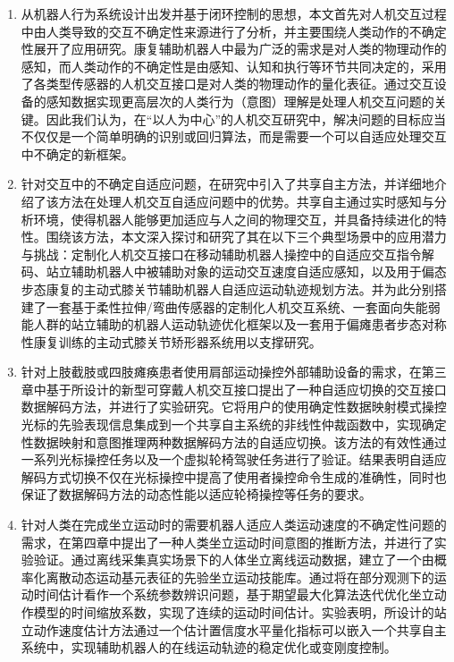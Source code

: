 \begin{enumerate}
\item 从机器人行为系统设计出发并基于闭环控制的思想，本文首先对人机交互过程中由人类导致的交互不确定性来源进行了分析，并主要围绕人类动作的不确定性展开了应用研究。康复辅助机器人中最为广泛的需求是对人类的物理动作的感知，而人类动作的不确定性是由感知、认知和执行等环节共同决定的，采用了各类型传感器的人机交互接口是对人类的物理动作的量化表征。通过交互设备的感知数据实现更高层次的人类行为（意图）理解是处理人机交互问题的关键。因此我们认为，在``以人为中心''的人机交互研究中，解决问题的目标应当不仅仅是一个简单明确的识别或回归算法，而是需要一个可以自适应处理交互中不确定的新框架。

\item 针对交互中的不确定自适应问题，在研究中引入了共享自主方法，并详细地介绍了该方法在处理人机交互自适应问题中的优势。共享自主通过实时感知与分析环境，使得机器人能够更加适应与人之间的物理交互，并具备持续进化的特性。围绕该方法，本文深入探讨和研究了其在以下三个典型场景中的应用潜力与挑战：定制化人机交互接口在移动辅助机器人操控中的自适应交互指令解码、站立辅助机器人中被辅助对象的运动交互速度自适应感知，以及用于偏态步态康复的主动式膝关节辅助机器人自适应运动轨迹规划方法。并为此分别搭建了一套基于柔性拉伸/弯曲传感器的定制化人机交互系统、一套面向失能弱能人群的站立辅助的机器人运动轨迹优化框架以及一套用于偏瘫患者步态对称性康复训练的主动式膝关节矫形器系统用以支撑研究。

\item 针对上肢截肢或四肢瘫痪患者使用肩部运动操控外部辅助设备的需求，在第三章中基于所设计的新型可穿戴人机交互接口提出了一种自适应切换的交互接口数据解码方法，并进行了实验研究。它将用户的使用确定性数据映射模式操控光标的先验表现信息集成到一个共享自主系统的非线性仲裁函数中，实现确定性数据映射和意图推理两种数据解码方法的自适应切换。该方法的有效性通过一系列光标操控任务以及一个虚拟轮椅驾驶任务进行了验证。结果表明自适应解码方式切换不仅在光标操控中提高了使用者操控命令生成的准确性，同时也保证了数据解码方法的动态性能以适应轮椅操控等任务的要求。

\item 针对人类在完成坐立运动时的需要机器人适应人类运动速度的不确定性问题的需求，在第四章中提出了一种人类坐立运动时间意图的推断方法，并进行了实验验证。通过离线采集真实场景下的人体坐立离线运动数据，建立了一个由概率化离散动态运动基元表征的先验坐立运动技能库。通过将在部分观测下的运动时间估计看作一个系统参数辨识问题，基于期望最大化算法迭代优化坐立动作模型的时间缩放系数，实现了连续的运动时间估计。实验表明，所设计的站立动作速度估计方法通过一个估计置信度水平量化指标可以嵌入一个共享自主系统中，实现辅助机器人的在线运动轨迹的稳定优化或变刚度控制。


\end{enumerate}

